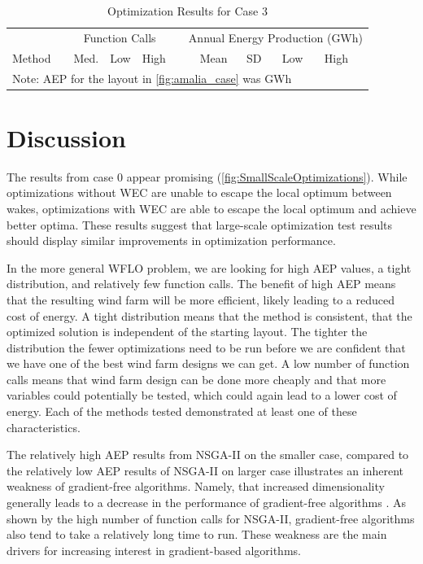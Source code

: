 \documentclass[a4paper]{jpconf}
\begin{document}
\begin{table}
	\caption{Optimization Results for Case 3}
	\label{tab:case3}
	\centering
	\begin{tabular}{lcrrrcrrrrr}
		\br
		& & \multicolumn{3}{c}{Function Calls} &  & \multicolumn{5}{c}{Annual Energy Production (GWh) } \\
		\cline{3-5}\cline{7-11}
		Method  & & Med. & Low & High & & Mean & SD & Low & High\\
		\cline{1-1}\cline{3-5}\cline{7-11}
		\multicolumn{11}{p{0.7\textwidth}}{Note: AEP for the layout in \cref{fig:amalia_case} was  GWh} 
	\end{tabular}
\end{table}

\section{Discussion}
The results from case 0 appear promising (\cref{fig:SmallScaleOptimizations}). While optimizations without WEC are unable to escape the local optimum between wakes, optimizations with WEC are able to escape the local optimum and achieve better optima. These  results suggest that large-scale optimization test results should display similar improvements in optimization performance.

In the more general WFLO problem, we are looking for high AEP values, a tight distribution, and relatively few function calls. The benefit of high AEP means that the resulting wind farm will be more efficient, likely leading to a reduced cost of energy. A tight distribution means that the method is consistent, that the optimized solution is independent of the starting layout. The tighter the distribution the fewer optimizations need to be run before we are confident that we have one of the best wind farm designs we can get. A low number of function calls means that wind farm design can be done more cheaply and that more variables could potentially be tested, which could again lead to a lower cost of energy. Each of the methods tested demonstrated at least one of these characteristics.

The relatively high AEP results from NSGA-II on the smaller case, compared to the relatively low AEP results of NSGA-II on larger case illustrates an inherent weakness of gradient-free algorithms. Namely, that increased dimensionality generally leads to a decrease in the performance of gradient-free algorithms \cite{rios2013-grad-free-comparison}. As shown by the high number of function calls for NSGA-II, gradient-free algorithms also tend to take a relatively long time to run. These weakness are the main drivers for increasing interest in gradient-based algorithms.
\end{document}
